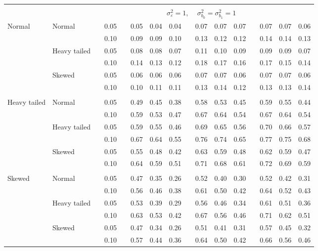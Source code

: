 \documentclass[12pt]{article} %
\begin{document}
\begin{table}[ht]
\begin{scriptsize}
\begin{center}
\begin{tabular}{ll p{.1cm} c p{.1cm} rrr p{.1cm} rrr p{.1cm} rrr}
&&&&&&&&&&&&&&&\\
& && && \multicolumn{9}{c}{$\sigma_{\varepsilon}^2 = 1$, \ \ $\sigma_{b_0}^2 = \sigma_{b_1}^2 = 1$} \\ \cline{6-16}
\rowcolor{gray!20}Normal       & Normal       && 0.05 &&   0.05 & 0.04 & 0.04 && 0.07 & 0.07 & 0.07 && 0.07 & 0.07 & 0.06 \\  
\rowcolor{gray!20}             &              && 0.10 &&   0.09 & 0.09 & 0.10 && 0.13 & 0.12 & 0.12 && 0.14 & 0.14 & 0.13 \\  
\rowcolor{gray!20}             & Heavy tailed && 0.05 &&   0.08 & 0.08 & 0.07 && 0.11 & 0.10 & 0.09 && 0.09 & 0.09 & 0.07 \\  
\rowcolor{gray!20}             &              && 0.10 &&   0.14 & 0.13 & 0.12 && 0.18 & 0.17 & 0.16 && 0.17 & 0.15 & 0.14 \\  
\rowcolor{gray!20}             & Skewed       && 0.05 &&   0.06 & 0.06 & 0.06 && 0.07 & 0.07 & 0.06 && 0.07 & 0.07 & 0.06 \\  
\rowcolor{gray!20}             &              && 0.10 &&   0.10 & 0.11 & 0.11 && 0.13 & 0.14 & 0.12 && 0.13 & 0.13 & 0.14 \\  
             &&&&&&&&&&&&&&&\\
Heavy tailed & Normal       && 0.05 &&   0.49 & 0.45 & 0.38 && 0.58 & 0.53 & 0.45 && 0.59 & 0.55 & 0.44 \\ 
             &              && 0.10 &&   0.59 & 0.53 & 0.47 && 0.67 & 0.64 & 0.54 && 0.67 & 0.64 & 0.54 \\ 
             & Heavy tailed && 0.05 &&   0.59 & 0.55 & 0.46 && 0.69 & 0.65 & 0.56 && 0.70 & 0.66 & 0.57 \\ 
             &              && 0.10 &&   0.67 & 0.64 & 0.55 && 0.76 & 0.74 & 0.65 && 0.77 & 0.75 & 0.68 \\ 
             & Skewed       && 0.05 &&   0.55 & 0.48 & 0.42 && 0.63 & 0.59 & 0.48 && 0.62 & 0.59 & 0.47 \\ 
             &              && 0.10 &&   0.64 & 0.59 & 0.51 && 0.71 & 0.68 & 0.61 && 0.72 & 0.69 & 0.59 \\ 
             &&&&&&&&&&&&&&&\\
Skewed       & Normal       && 0.05 &&   0.47 & 0.35 & 0.26 && 0.52 & 0.40 & 0.30 && 0.52 & 0.42 & 0.31 \\
             &              && 0.10 &&   0.56 & 0.46 & 0.38 && 0.61 & 0.50 & 0.42 && 0.64 & 0.52 & 0.43 \\
             & Heavy tailed && 0.05 &&   0.53 & 0.39 & 0.29 && 0.56 & 0.46 & 0.34 && 0.61 & 0.51 & 0.36 \\
             &              && 0.10 &&   0.63 & 0.53 & 0.42 && 0.67 & 0.56 & 0.46 && 0.71 & 0.62 & 0.51 \\
             & Skewed       && 0.05 &&   0.47 & 0.34 & 0.26 && 0.51 & 0.41 & 0.31 && 0.57 & 0.45 & 0.32 \\
             &              && 0.10 &&   0.57 & 0.44 & 0.36 && 0.64 & 0.50 & 0.42 && 0.66 & 0.56 & 0.46 \\



\end{tabular}
\end{center}
\end{scriptsize}
\end{table}
\end{document}
